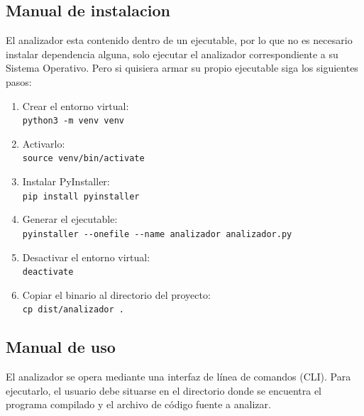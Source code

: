 \documentclass[12pt]{article}
\begin{document}
\subsection{Manual de instalacion}

El analizador esta contenido dentro de un ejecutable, por lo que no es necesario instalar dependencia alguna, solo ejecutar el analizador correspondiente a su Sistema Operativo. Pero si quisiera armar su propio ejecutable siga los siguientes pasos:

\begin{enumerate}
    \item Crear el entorno virtual:\\
    \verb|python3 -m venv venv|

    \item Activarlo:\\
    \verb|source venv/bin/activate|

    \item Instalar PyInstaller:\\
    \verb|pip install pyinstaller|

    \item Generar el ejecutable:\\
    \verb|pyinstaller --onefile --name analizador analizador.py|

    \item Desactivar el entorno virtual:\\
    \verb|deactivate|

    \item Copiar el binario al directorio del proyecto:\\
    \verb|cp dist/analizador .|
\end{enumerate}

\subsection{Manual de uso}

El analizador se opera mediante una interfaz de línea de comandos (CLI). Para ejecutarlo, el usuario debe situarse en el directorio donde se encuentra el programa compilado y el archivo de código fuente a analizar. 
\end{document}
